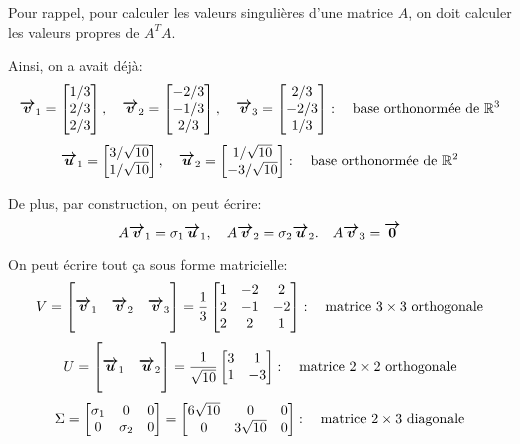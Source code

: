 \documentclass[a4paper]{article}
\begin{document}
{    Pour rappel, pour calculer les valeurs singulières d'une matrice $A$, on doit calculer les valeurs propres de $A^T A$. 

    Ainsi, on a avait déjà: 
    \[\bm{\protect\overrightarrow{v}}_1 = \begin{bmatrix} 1 / 3 \\  2 / 3 \\ 2 / 3\end{bmatrix}, \quad \bm{\protect\overrightarrow{v}}_2 = \begin{bmatrix} -2 / 3 \\ -1 / 3 \\ 2 / 3 \end{bmatrix}, \quad \bm{\protect\overrightarrow{v}}_3 = \begin{bmatrix} 2 / 3 \\ -2 / 3 \\ 1 / 3 \end{bmatrix}: \quad \text{base orthonormée de } \mathbb{R}^3\]
    \[\bm{\protect\overrightarrow{u}}_1 = \begin{bmatrix} 3 / \sqrt{10} \\ 1 / \sqrt{10} \end{bmatrix}, \quad \bm{\protect\overrightarrow{u}}_2 = \begin{bmatrix} 1 / \sqrt{10} \\ -3 / \sqrt{10} \end{bmatrix}: \quad \text{base orthonormée de } \mathbb{R}^2\]
    
    De plus, par construction, on peut écrire: 
    \[A \bm{\protect\overrightarrow{v}}_1 = \sigma_1 \bm{\protect\overrightarrow{u}}_1, \quad A \bm{\protect\overrightarrow{v}}_2 = \sigma_2 \bm{\protect\overrightarrow{u}}_2. \quad A \bm{\protect\overrightarrow{v}}_3 = \bm{\protect\overrightarrow{0}}\]

    On peut écrire tout ça sous forme matricielle: 
    \[V = \begin{bmatrix}  &  &  \\ \bm{\protect\overrightarrow{v}}_1 & \bm{\protect\overrightarrow{v}}_2 & \bm{\protect\overrightarrow{v}}_3 \\  &  &  \end{bmatrix} = \frac{1}{3} \begin{bmatrix} 1 & -2 & 2 \\ 2 & -1 & -2 \\ 2 & 2 & 1 \end{bmatrix}: \quad \text{matrice $3\times3$ orthogonale}\]
    \[U = \begin{bmatrix}  &  \\ \bm{\protect\overrightarrow{u}}_1 & \bm{\protect\overrightarrow{u}}_2 \\  &  \end{bmatrix} = \frac{1}{\sqrt{10}} \begin{bmatrix} 3 & 1 \\ 1 & -3 \end{bmatrix}: \quad \text{matrice $2 \times2$ orthogonale} \]
    \[\Sigma = \begin{bmatrix} \sigma_1 & 0 & 0 \\ 0 & \sigma_2 & 0 \end{bmatrix} = \begin{bmatrix} 6 \sqrt{10} & 0 & 0 \\ 0 & 3\sqrt{10} & 0 \end{bmatrix}: \quad \text{matrice $2 \times 3$ diagonale}\]

}
\end{document}
